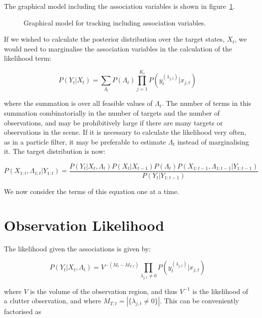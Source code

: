The graphical model including the association variables is shown in figure~\ref{fig:HMMAssoc}.

\begin{figure}%

\caption{Graphical model for tracking including association variables.}%
\label{fig:HMMAssoc}%
\end{figure}

If we wished to calculate the posterior distribution over the target states, $X_t$, we would need to marginalise the association variables in the calculation of the likelihood term:

\begin{equation}
P(Y_t|X_t) = \sum_{\Lambda_t} P(\Lambda_t) \prod_{j=1}^{K_t} P(y_t^{(\lambda_{j,t})}|x_{j,t})
\label{eq:MarginaliseAssociations}
\end{equation}

where the summation is over all feasible values of $\Lambda_t$. The number of terms in this summation combinatorially in the number of targets and the number of observations, and may be prohibitively large if there are many targets or observations in the scene. If it is necessary to calculate the likelihood very often, as in a particle filter, it may be preferable to estimate $\Lambda_t$ instead of marginalising it. The target distribution is now:

\begin{equation}
P(X_{1:t}, \Lambda_{1:t}|Y_{1:t}) = \frac{P(Y_t|X_t, \Lambda_t) P(X_t|X_{t-1}) P(\Lambda_t) P(X_{1:t-1}, \Lambda_{1:t-1}|Y_{1:t-1})}{P(Y_t|Y_{1:t-1})}
\label{eq:MTPosterior}
\end{equation}

We now consider the terms of this equation one at a time.

\section{Observation Likelihood}
The likelihood given the associations is given by:

\begin{equation}
P(Y_t|X_t, \Lambda_t) = V^{-(M_t-M_{T,t})} \prod_{\lambda_{j,t} \ne 0} P(y_t^{(\lambda_{j,t})}|x_{j,t})
\label{eq:MTLikelihood}
\end{equation}

where $V$ is the volume of the observation region, and thus $V^{-1}$ is the likelihood of a clutter observation, and where $M_{T,t} = \left| \{ \lambda_{j,t} \ne 0 \} \right|$. This can be conveniently factorised as

